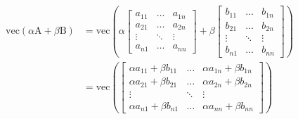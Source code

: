 \documentclass[11pt,a4paper]{article}
\begin{document}
\begin{align*}
\mathrm{vec}(\alpha \mathrm{A} + \beta \mathrm{B})
&= 
\mathrm{vec} \left(
\alpha
\begin{bmatrix}
 		a_{11} &  \ldots & a_{1n} \\
 		a_{21} &  \ldots & a_{2n} \\
 		\vdots &  \ddots & \vdots \\
 		a_{n1} &  \ldots & a_{nn} 
\end{bmatrix}
+ \beta
\begin{bmatrix}
 		b_{11} &  \ldots & b_{1n} \\
 		b_{21} &  \ldots & b_{2n} \\
 		\vdots &  \ddots & \vdots \\
 		b_{n1} &  \ldots & b_{nn} 
\end{bmatrix}
			\right) \\
&=
\mathrm{vec} \left(
\begin{bmatrix}
\alpha a_{11}+ \beta b_{11} &  \ldots & \alpha a_{1n}+ \beta b_{1n} \\
\alpha a_{21}+ \beta b_{21} &  \ldots & \alpha a_{2n}+ \beta b_{2n} \\
\vdots &  \ddots & \vdots \\
\alpha a_{n1}+ \beta b_{n1} &  \ldots & \alpha a_{nn}+ \beta b_{nn} 
\end{bmatrix}
			\right)
\end{align*}
\end{document}
